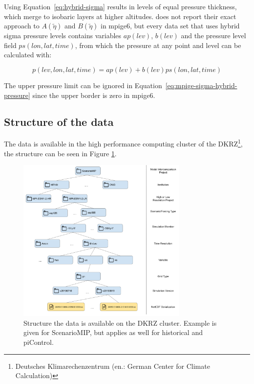 Using Equation~\ref{eq:hybrid-sigma} results in levels of equal pressure thickness, which merge to isobaric layers at higher altitudes. 
 does not report their exact approach to $A(\tilde{\eta})$ and $B(\tilde{\eta})$ in \ac{mpige6}, but every data set that uses hybrid sigma pressure levels contains variables $ap(lev)$, $b(lev)$ and the pressure level field $ps(lon, lat, time)$, from which the pressure at any point and level can be calculated with:

\begin{equation}
\label{eq:mpige-sigma-hybrid-pressure}
p(lev, lon, lat, time) = ap(lev) + b(lev) ps(lon, lat, time)
\end{equation}


The upper pressure limit can be ignored in Equation~\ref{eq:mpige-sigma-hybrid-pressure} since the upper border is zero in \ac{mpige6}.


\subsection{Structure of the data}

The data is available in the high performance computing cluster of the DKRZ\footnote{Deutsches Klimarechenzentrum (en.: German Center for Climate Calculation)}, the structure can be seen in Figure \ref{fig:data-structure}.

\begin{figure}[htb]
  \begin{center}
    \includegraphics[width=0.75\textwidth]{figures/data_structure.png}
  \end{center}
  \caption[Illustration of Data Structure MPI GE CMIP6]{Structure the data is available on the DKRZ cluster. Example is given for ScenarioMIP, but applies as well for historical and piControl.}\label{fig:data-structure}
\end{figure}

